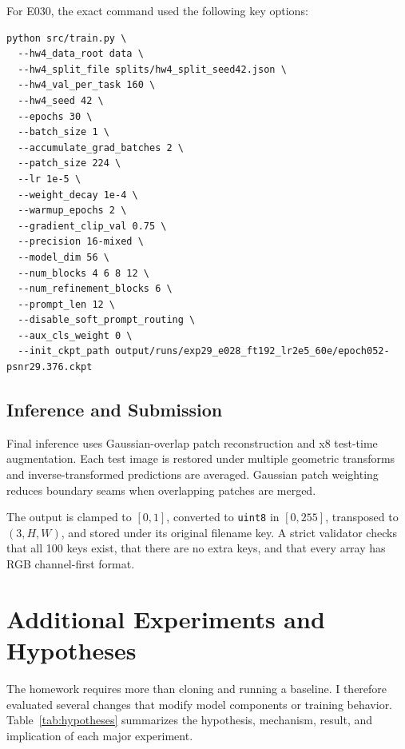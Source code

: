 \documentclass[10pt,conference]{article}
\begin{document}
For E030, the exact command used the following key options:
\begin{lstlisting}
python src/train.py \
  --hw4_data_root data \
  --hw4_split_file splits/hw4_split_seed42.json \
  --hw4_val_per_task 160 \
  --hw4_seed 42 \
  --epochs 30 \
  --batch_size 1 \
  --accumulate_grad_batches 2 \
  --patch_size 224 \
  --lr 1e-5 \
  --weight_decay 1e-4 \
  --warmup_epochs 2 \
  --gradient_clip_val 0.75 \
  --precision 16-mixed \
  --model_dim 56 \
  --num_blocks 4 6 8 12 \
  --num_refinement_blocks 6 \
  --prompt_len 12 \
  --disable_soft_prompt_routing \
  --aux_cls_weight 0 \
  --init_ckpt_path output/runs/exp29_e028_ft192_lr2e5_60e/epoch052-psnr29.376.ckpt
\end{lstlisting}

\subsection{Inference and Submission}

Final inference uses Gaussian-overlap patch reconstruction and x8 test-time augmentation. Each test image is restored under multiple geometric transforms and inverse-transformed predictions are averaged. Gaussian patch weighting reduces boundary seams when overlapping patches are merged.

The output is clamped to $[0,1]$, converted to \texttt{uint8} in $[0,255]$, transposed to $(3,H,W)$, and stored under its original filename key. A strict validator checks that all 100 keys exist, that there are no extra keys, and that every array has RGB channel-first format.

\section{Additional Experiments and Hypotheses}

The homework requires more than cloning and running a baseline. I therefore evaluated several changes that modify model components or training behavior. Table~\ref{tab:hypotheses} summarizes the hypothesis, mechanism, result, and implication of each major experiment.
\end{document}
